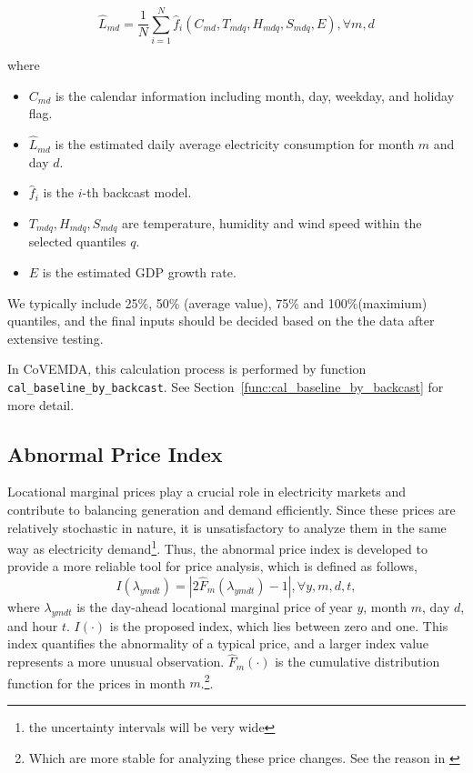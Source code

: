 \documentclass[10pt]{article}
\newcommand{\covemda}{CoVEMDA}
\numberwithin{equation}{section}
\numberwithin{table}{section}
\numberwithin{figure}{section}
\begin{document}
\begin{equation*}
  \hat L_{md}=\frac{1}{N}\sum\limits_{i=1}^N \hat f_i(C_{md}, T_{mdq}, H_{mdq}, S_{mdq}, E),\forall m,d
\end{equation*}

where 
\begin{itemize}
  \item $C_{md}$ is the calendar information including month, day, weekday, and holiday flag.
  \item $\hat L_{md}$ is the estimated daily average electricity consumption for month $m$ and day $d$.
  \item $\hat f_i$ is the $i$-th backcast model.
  \item $T_{mdq},H_{mdq},S_{mdq}$ are temperature, humidity and wind speed within the selected quantiles $q$.
  \item $E$ is the estimated GDP growth rate.
\end{itemize}
We typically include 25\%, 50\% (average value), 75\% and 100\%(maximium) quantiles, and the final inputs should be decided based on the the data after extensive testing.

In \covemda{}, this calculation process is performed by function \verb!cal_baseline_by_backcast!. See Section~\ref{func:cal_baseline_by_backcast} for more detail.



\subsection{Abnormal Price Index}\label{subsec:abnormal_price_index}

Locational marginal prices play a crucial role in electricity markets and contribute to balancing generation and demand efficiently. Since these prices are relatively stochastic in nature, it is unsatisfactory to analyze them in the same way as electricity demand\footnote{the uncertainty intervals will be very wide}. Thus, the abnormal price index is developed to provide a more reliable tool for price analysis, which is defined as follows,
\begin{equation*}
  I(\lambda_{ymdt})=|2\hat F_m(\lambda_{ymdt})-1|, \forall y,m,d,t,
\end{equation*}
where $\lambda_{ymdt}$ is the day-ahead locational marginal price of year $y$, month $m$, day $d$, and hour $t$. $I(\cdot)$ is the proposed index, which lies between zero and one. This index quantifies the abnormality of a typical price, and a larger index value represents a more unusual observation. $\hat F_m(\cdot)$ is the cumulative distribution function for the prices in month $m$.\footnote{Which are more stable for analyzing these price changes. See the reason in \cite{quantitaveassess}}.
\end{document}
